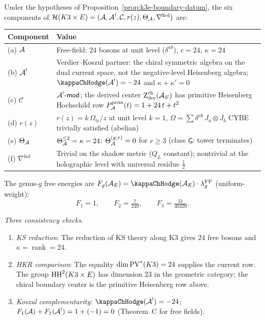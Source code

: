 \begin{computation}
\label{comp:k3e-holographic-datum}
Under the hypotheses of Proposition~\ref{prop:k3e-boundary-datum},
the six components of
$\mathcal{H}(K3 \times E) = (\mathcal{A}, \mathcal{A}^!, \mathcal{C}, r(z),
\Theta_{\mathcal{A}}, \nabla^{\mathrm{hol}})$ are:
\begin{center}
\renewcommand{\arraystretch}{1.35}
\small
\begin{tabular}{lp{9.5cm}}
\textbf{Component} & \textbf{Value} \\
\hline
(a) $\mathcal{A}$ & Free-field: $24$ bosons at unit level ($\delta^{ab}$),
 $c = 24$, $\kappa = 24$ \\
(b) $\mathcal{A}^!$ & Verdier--Koszul partner: the chiral symmetric algebra on
 the dual current space, not the negative-level Heisenberg algebra;
 $\kappaChHodge(\cA^!) = -24$ and
 $\kappa + \kappa' = 0$ \\
(c) $\mathcal{C}$ & $\mathcal{A}^!\text{-}\mathsf{mod}$;
 the derived center $\operatorname{Z}_{\mathrm{der}}^{\mathrm{ch}}(\mathcal{A}_E)$
 has primitive Heisenberg Hochschild row
 $P_{\mathcal{A}}^{\mathrm{prim}}(t) = 1 + 24\,t + t^2$ \\
(d) $r(z)$ & $r(z) = k\,\Omega_{\mathrm{tr}}/z$ at unit level $k = 1$,
 $\Omega = \sum \delta^{ab}\,J_a \otimes J_b$ CYBE trivially satisfied \textup{(}abelian\textup{)} \\
(e) $\Theta_{\mathcal{A}}$ & $\Theta_{\mathcal{A}}^{\leq 2} = \kappa = 24$;
 $\Theta_{\mathcal{A}}^{(g,r)} = 0$ for $r \geq 3$
 \textup{(}class $\mathsf{G}$: tower terminates\textup{)} \\
(f) $\nabla^{\mathrm{hol}}$ & Trivial on the shadow metric
 \textup{(}$Q_L$ constant\textup{)};
 nontrivial at the holographic level with
 universal residue $\tfrac{1}{2}$
\end{tabular}
\end{center}

The genus-$g$ free energies are
$F_g(\cA_E) = \kappaChHodge(\cA_E) \cdot \lambda_g^{\mathrm{FP}}$
\textup{(}uniform-weight\textup{)}:
\begin{equation}\label{eq:k3e-genus-amplitudes}
F_1 = 1, \qquad
F_2 = \tfrac{7}{240}, \qquad
F_3 = \tfrac{31}{40320}.
\end{equation}

\emph{Three consistency checks.}
\begin{enumerate}
\item \emph{KS reduction}: The reduction of KS theory along K3 gives
 $24$ free bosons and $\kappa = \operatorname{rank} = 24$.
\item \emph{HKR comparison}: The equality $\dim \operatorname{PV}^*(K3) = 24$
 supplies the current row. The group $\operatorname{HH}^2(K3 \times E)$ has dimension
 $23$ in the geometric category; the chiral boundary center is the
 primitive Heisenberg row above.
\item \emph{Koszul complementarity}: $\kappaChHodge(\cA^!) = -24$;
 $F_1(\mathcal{A}) + F_1(\mathcal{A}^!) = 1 + ({-}1) = 0$ \textup{(}Theorem~C
 for free fields\textup{)}.
\end{enumerate}
\end{computation}


